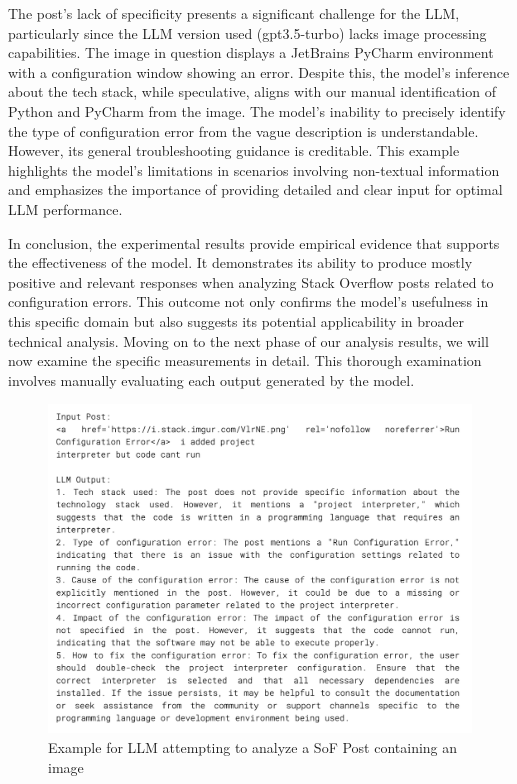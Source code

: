 \documentclass[english,bachelor]{swsLeipzig}
\begin{document}
The post's lack of specificity presents a significant challenge for the LLM, particularly since the LLM 
version used (gpt3.5-turbo) lacks image processing capabilities. The image in question displays a JetBrains PyCharm environment with a configuration window showing an error. Despite this, the model's inference about the tech stack, while speculative, aligns with our manual identification of Python and PyCharm from the image. The model's inability to precisely identify the type of configuration error from the vague description is understandable. However, its general troubleshooting guidance is creditable. This example highlights the model's limitations in scenarios involving non-textual information and emphasizes the importance of providing detailed and clear input for optimal LLM performance.

In conclusion, the experimental results provide empirical evidence that supports the effectiveness of 
the model. It demonstrates its ability to produce mostly positive and relevant responses when analyzing Stack Overflow posts related to configuration errors. This outcome not only confirms the model's usefulness in this specific domain but also suggests its potential applicability in broader technical analysis. Moving on to the next phase of our analysis results, we will now examine the specific measurements in detail. This thorough examination involves manually evaluating each output generated by the model.

\begin{figure}[h]
  \centering
  \includegraphics[width=1\textwidth]{images/failanalysis.png}
  \caption{Example for LLM attempting to analyze a SoF Post containing an image}
  \label{fig:figure513}
\end{figure}
\end{document}
